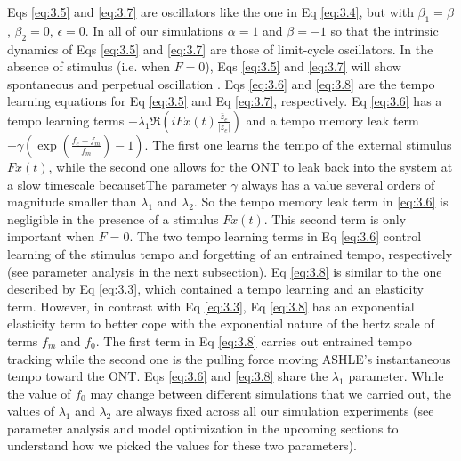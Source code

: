 \documentclass{report}
\begin{document}
Eqs \eqref{eq:3.5} and \eqref{eq:3.7} are oscillators like the one in Eq \eqref{eq:3.4}, but with $\beta_1 = \beta$, $\beta_2=0$, $\epsilon=0$. In all of our simulations $\alpha=1$ and $\beta=-1$ so that the intrinsic dynamics of Eqs \eqref{eq:3.5} and \eqref{eq:3.7} are those of limit-cycle oscillators. In the absence of stimulus (i.e. when $F = 0$), Eqs \eqref{eq:3.5} and \eqref{eq:3.7} will show spontaneous and perpetual oscillation \cite{kim2015signal}. Eqs \eqref{eq:3.6} and \eqref{eq:3.8} are the tempo learning equations for Eq \eqref{eq:3.5} and Eq \eqref{eq:3.7}, respectively. Eq \eqref{eq:3.6} has a tempo learning terms $-\lambda_1\Re\left( iFx(t)\frac{\bar{z}_e}{|z_e|} \right)$ and a tempo memory leak term $-\gamma\left( \exp\left(\frac{f_e-f_m}{f_m}\right)-1 \right)$. The first one learns the tempo of the external stimulus $Fx(t)$, while the second one allows for the ONT to leak back into the system at a slow timescale becausetThe parameter $\gamma$ always has a value several orders of magnitude smaller than $\lambda_1$ and $\lambda_2$. So the tempo memory leak term in \eqref{eq:3.6} is negligible in the presence of a stimulus $Fx(t)$. This second term is only important when $F = 0$. The two tempo learning terms in Eq \eqref{eq:3.6} control learning of the stimulus tempo and forgetting of an entrained tempo, respectively (see parameter analysis in the next subsection). Eq \eqref{eq:3.8} is similar to the one described by Eq \eqref{eq:3.3}, which contained a tempo learning and an elasticity term. However, in contrast with Eq \eqref{eq:3.3}, Eq \eqref{eq:3.8} has an exponential elasticity term to better cope with the exponential nature of the hertz scale of terms $f_m$ and $f_0$. The first term in Eq \eqref{eq:3.8} carries out entrained tempo tracking while the second one is the pulling force moving ASHLE's instantaneous tempo toward the ONT. Eqs \eqref{eq:3.6} and \eqref{eq:3.8} share the $\lambda_1$ parameter. While the value of $f_0$ may change between different simulations that we carried out, the values of $\lambda_1$ and $\lambda_2$ are always fixed across all our simulation experiments (see parameter analysis and model optimization in the upcoming sections to understand how we picked the values for these two parameters).
\end{document}
